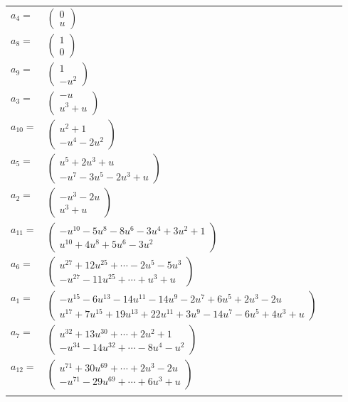 \documentclass[1p]{elsarticle_modified}
\theoremstyle{definition}
\begin{document}
\begin{tabular}{m{7pt} m{180pt} m{7pt} m{180pt} }
\flushright $a_{4}=$&$\begin{pmatrix}0\\u\end{pmatrix}$ \\
\flushright $a_{8}=$&$\begin{pmatrix}1\\0\end{pmatrix}$ \\
\flushright $a_{9}=$&$\begin{pmatrix}1\\- u^2\end{pmatrix}$ \\
\flushright $a_{3}=$&$\begin{pmatrix}- u\\u^3+u\end{pmatrix}$ \\
\flushright $a_{10}=$&$\begin{pmatrix}u^2+1\\- u^4-2 u^2\end{pmatrix}$ \\
\flushright $a_{5}=$&$\begin{pmatrix}u^5+2 u^3+u\\- u^7-3 u^5-2 u^3+u\end{pmatrix}$ \\
\flushright $a_{2}=$&$\begin{pmatrix}- u^3-2 u\\u^3+u\end{pmatrix}$ \\
\flushright $a_{11}=$&$\begin{pmatrix}- u^{10}-5 u^8-8 u^6-3 u^4+3 u^2+1\\u^{10}+4 u^8+5 u^6-3 u^2\end{pmatrix}$ \\
\flushright $a_{6}=$&$\begin{pmatrix}u^{27}+12 u^{25}+\cdots-2 u^5-5 u^3\\- u^{27}-11 u^{25}+\cdots+u^3+u\end{pmatrix}$ \\
\flushright $a_{1}=$&$\begin{pmatrix}- u^{15}-6 u^{13}-14 u^{11}-14 u^9-2 u^7+6 u^5+2 u^3-2 u\\u^{17}+7 u^{15}+19 u^{13}+22 u^{11}+3 u^9-14 u^7-6 u^5+4 u^3+u\end{pmatrix}$ \\
\flushright $a_{7}=$&$\begin{pmatrix}u^{32}+13 u^{30}+\cdots+2 u^2+1\\- u^{34}-14 u^{32}+\cdots-8 u^4- u^2\end{pmatrix}$ \\
\flushright $a_{12}=$&$\begin{pmatrix}u^{71}+30 u^{69}+\cdots+2 u^3-2 u\\- u^{71}-29 u^{69}+\cdots+6 u^3+u\end{pmatrix}$\\&\end{tabular}
\end{document}
